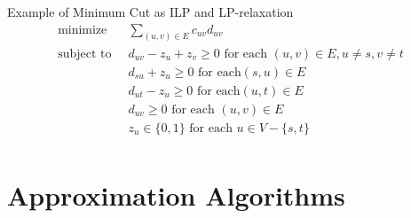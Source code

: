 \documentclass[onecolumn]{report}
\begin{document}
Example of Minimum Cut as ILP and LP-relaxation\\
\begin{align*}
    \text{minimize  } \:& \sum_{(u,v) \in E} c_{uv}d_{uv}\\
    \text{subject to  } \:& d_{uv} - z_u + z_v \geq 0 \text{ for each } (u,v) \in E,u \neq s, v \neq t\\
    & d_{su} +z_u \geq 0 \text{ for each} (s,u) \in E\\
    & d_{ut} - z_u \geq 0 \text{ for each} (u,t) \in E\\
    & d_{uv} \geq 0 \text{ for each } (u,v) \in E\\
    & z_u \in \{0,1\} \text{ for each } u \in V-\{s,t\}\\
\end{align*}




\chapter{Approximation Algorithms}
\end{document}

